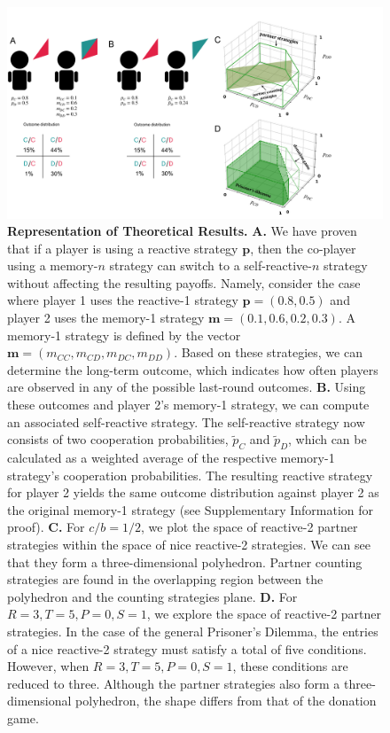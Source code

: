 \documentclass{article}
\theoremstyle{definition}
\begin{document}
\begin{figure}[htbp!]
  \centering
  \includegraphics[width=.9\textwidth]{figures/conceptual_figure_results.pdf}
  \caption{\textbf{Representation of Theoretical Results.} \textbf{A.} We have
proven that if a player is using a reactive strategy $\mathbf{p}$, then the
co-player using a memory-$n$ strategy can switch to a self-reactive-$n$ strategy
without affecting the resulting payoffs. Namely, consider the case where player
1 uses the reactive-1 strategy $\mathbf{p} = (0.8, 0.5)$ and player 2 uses the
memory-1 strategy $\mathbf{m} = (0.1, 0.6, 0.2, 0.3)$. A memory-1 strategy is
defined by the vector $\mathbf{m} = (m_{CC}, m_{CD}, m_{DC}, m_{DD})$. Based on
these strategies, we can determine the long-term outcome, which indicates how
often players are observed in any of the possible last-round outcomes. 
\textbf{B.} Using
these outcomes and player 2's memory-1 strategy, we can compute an associated
self-reactive strategy. The self-reactive strategy now consists of two
cooperation probabilities, $\tilde{p}_C$ and $\tilde{p}_D$, which can be
calculated as a weighted average of the respective memory-1 strategy's
cooperation probabilities. The resulting reactive strategy for player 2 yields
the same outcome distribution against player 2 as the original memory-1 strategy
(see Supplementary Information for proof). \textbf{C.} For $c/b = 1/2$, we plot the space of
reactive-2 partner strategies within the space of nice reactive-2 strategies. We
can see that they form a three-dimensional polyhedron. Partner counting strategies
are found in the overlapping region between the polyhedron and the counting
strategies plane.
\textbf{D.} For $R=3, T=5, P=0, S=1$, we explore the space of reactive-2 partner
strategies. In the case of the general Prisoner's Dilemma, the entries of a
nice reactive-2 strategy must satisfy a total of five conditions. However,
when $R=3, T=5, P=0, S=1$, these conditions are reduced to three. Although the
partner strategies also form a three-dimensional polyhedron, the shape differs
from that of the donation game.}\label{fig:conceptual_figure_results}
\end{figure}
\end{document}
